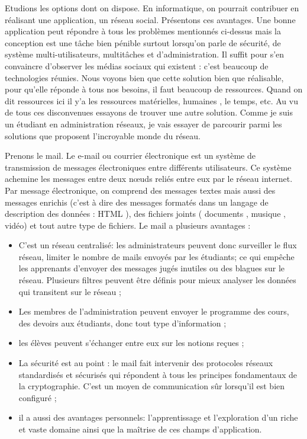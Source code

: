 \documentclass[a4paper,12pt,french]{report} %
\begin{document}
	Etudions les options dont on dispose. En informatique, on pourrait contribuer en réalisant une application, un réseau social.
Présentons ces avantages. Une bonne application peut répondre à tous les problèmes mentionnés ci-dessus mais la conception est une tâche bien pénible surtout lorsqu'on parle de sécurité, de système multi-utilisateurs, multitâches et d'administration. Il suffit pour s'en convaincre d'observer les médias sociaux qui existent : c'est beaucoup %
de technologies réunies. Nous voyons bien que cette solution bien que réalisable, pour qu'elle réponde à tous nos besoins, il faut beaucoup de ressources. Quand on dit ressources ici il y'a les ressources matérielles, humaines , le temps, etc. Au vu de tous ces disconvenues essayons de trouver une autre solution. Comme je suis un étudiant en administration réseaux, je vais essayer de parcourir parmi les solutions que proposent l'incroyable monde du réseau.

	Prenons le mail. Le e-mail ou courrier électronique est un système de transmission de messages électroniques entre différents utilisateurs. Ce système achemine les messages entre deux nœuds reliés entre eux par le réseau internet. Par message électronique, on comprend des messages textes mais aussi des messages enrichis (c'est à dire des messages formatés dans un langage de description des données : HTML \label{ref:html} ), des fichiers joints ( documents , musique , vidéo) et tout autre type de fichiers. Le mail a plusieurs avantages :
\begin{itemize}
	\item C'est un réseau centralisé: les administrateurs peuvent donc surveiller le flux réseau, limiter le nombre de mails envoyés par les étudiants; ce qui empêche les apprenants d'envoyer des messages jugés inutiles ou des blagues sur le réseau. Plusieurs filtres peuvent être définis pour mieux analyser les données qui transitent sur le réseau ;
	\item Les membres de l'administration  peuvent envoyer le programme des cours, des devoirs aux étudiants, donc tout type d'information ;
	\item les élèves peuvent s'échanger entre eux sur les notions reçues ; 
	\item La sécurité est au point : le mail fait intervenir des protocoles réseaux standardisés et sécurisés qui répondent à tous les principes fondamentaux de la cryptographie. C'est un moyen de communication sûr lorsqu'il est bien configuré ;
	\item il a aussi des avantages personnels: l'apprentissage et l'exploration d'un riche et vaste domaine ainsi que la maîtrise de ces champs d'application.
\end{itemize}
\end{document}
